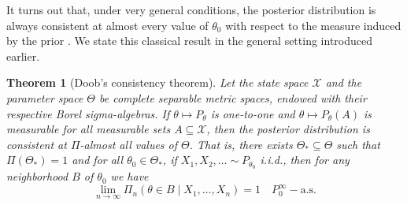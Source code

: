 \documentclass{article}
\numberwithin{equation}{section}
\theoremstyle{plain}
\newtheorem{theorem}{Theorem}
\theoremstyle{definition}
\begin{document}
It turns out that, under very general conditions, the posterior distribution is always consistent at almost every value of \(\theta_0\) with respect to the measure induced by the prior \citep{doob1949application}. We state this classical result in the general setting introduced earlier.

\begin{theorem}[Doob's consistency theorem]\label{th:doob}
Let the state space \(\mathcal X\) and the parameter space \(\Theta\) be complete separable metric spaces, endowed with their respective Borel sigma-algebras. If \(\theta \mapsto P_\theta\) is one-to-one and \(\theta \mapsto P_\theta(A)\) is measurable for all measurable sets \(A\subseteq \mathcal X\), then the posterior distribution is consistent at \(\Pi\)-almost all values of \(\Theta\). That is, there exists \(\Theta_*\subseteq \Theta\) such that \(\Pi(\Theta_*)=1\) and for all \(\theta_0\in\Theta_*\), if \(X_1,X_2,\ldots \sim P_{\theta_0}\) i.i.d., then for any neighborhood \(B\) of \(\theta_0\) we have
  \[
    \lim_{n\to\infty} \Pi_n(\theta \in B \mid X_1,\dots, X_n) = 1 \quad P_{0}^\infty-\text{a.s.}
  \]
\end{theorem}
\end{document}
